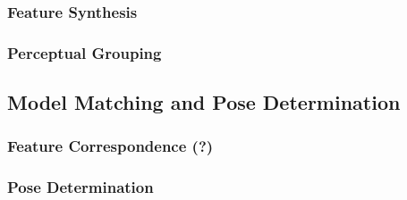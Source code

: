 \subsubsection{Feature Synthesis}

\subsubsection{Perceptual Grouping}

\subsection{Model Matching and Pose Determination}

\subsubsection{Feature Correspondence (?)}

\subsubsection{Pose Determination}


